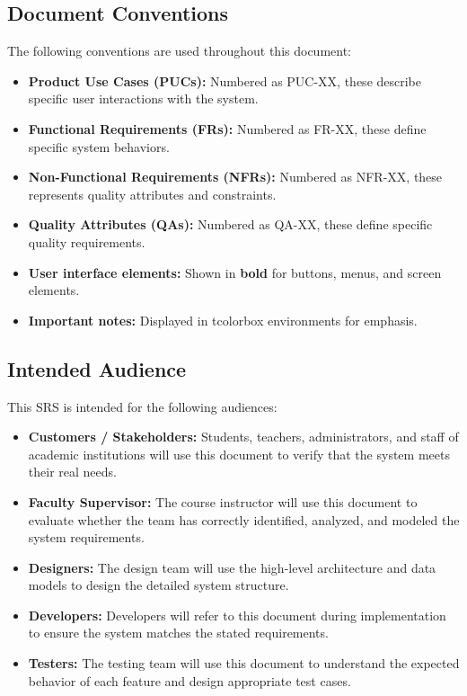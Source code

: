 \documentclass[12pt,a4paper]{article}
\begin{document}
\subsection{Document Conventions}

The following conventions are used throughout this document:

\begin{itemize}[leftmargin=*, label=\textbullet, itemsep=3pt]
  \item \textbf{Product Use Cases (PUCs):} Numbered as PUC-XX, these describe specific user interactions with the system.
  \item \textbf{Functional Requirements (FRs):} Numbered as FR-XX, these define specific system behaviors.
  \item \textbf{Non-Functional Requirements (NFRs):} Numbered as NFR-XX, these represents quality attributes and constraints.
  \item \textbf{Quality Attributes (QAs):} Numbered as QA-XX, these define specific quality requirements.
  \item \textbf{User interface elements:} Shown in \textbf{bold} for buttons, menus, and screen elements.
  \item \textbf{Important notes:} Displayed in tcolorbox environments for emphasis.
\end{itemize}

\subsection{Intended Audience}

This SRS is intended for the following audiences:

\begin{itemize}[leftmargin=*, label=\textbullet, itemsep=4pt]
  \item \textbf{Customers / Stakeholders:} Students, teachers, administrators, and staff of academic institutions will use this document to verify that the system meets their real needs.
  \item \textbf{Faculty Supervisor:} The course instructor will use this document to evaluate whether the team has correctly identified, analyzed, and modeled the system requirements.
  \item \textbf{Designers:} The design team will use the high-level architecture and data models to design the detailed system structure.
  \item \textbf{Developers:} Developers will refer to this document during implementation to ensure the system matches the stated requirements.
  \item \textbf{Testers:} The testing team will use this document to understand the expected behavior of each feature and design appropriate test cases.
\end{itemize}
\end{document}
